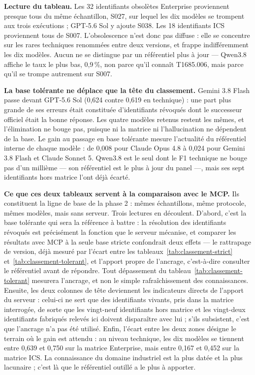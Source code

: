 \textbf{Lecture du tableau.} Les 32 identifiants obsolètes Enterprise proviennent presque tous du même échantillon, S027, sur lequel les dix modèles se trompent aux trois exécutions ; GPT-5.6 Sol y ajoute S038. Les 18 identifiants ICS proviennent tous de S007. L'obsolescence n'est donc pas diffuse : elle se concentre sur les rares techniques renommées entre deux versions, et frappe indifféremment les dix modèles. Aucun ne se distingue par un référentiel plus à jour --- Qwen3.8 affiche le taux le plus bas, 0,9\,\%, non parce qu'il connaît T1685.006, mais parce qu'il se trompe autrement sur S007.

\textbf{La base tolérante ne déplace que la tête du classement.} Gemini 3.8 Flash passe devant GPT-5.6 Sol (0,624 contre 0,619 en technique) : une part plus grande de ses erreurs était constituée d'identifiants révoqués dont le successeur officiel était la bonne réponse. Les quatre modèles retenus restent les mêmes, et l'élimination ne bouge pas, puisque ni la matrice ni l'hallucination ne dépendent de la base. Le gain au passage en base tolérante mesure l'actualité du référentiel interne de chaque modèle : de 0,008 pour Claude Opus 4.8 à 0,024 pour Gemini 3.8 Flash et Claude Sonnet 5. Qwen3.8 est le seul dont le F1 technique ne bouge pas d'un millième --- son référentiel est le plus à jour du panel ---, mais ses sept identifiants hors matrice l'ont déjà écarté.

\textbf{Ce que ces deux tableaux servent à la comparaison avec le MCP.} Ils constituent la ligne de base de la phase 2 : mêmes échantillons, même protocole, mêmes modèles, mais sans serveur. Trois lectures en découlent. D'abord, c'est la base tolérante qui sera la référence à battre : la résolution des identifiants révoqués est précisément la fonction que le serveur mécanise, et comparer les résultats avec MCP à la seule base stricte confondrait deux effets --- le rattrapage de version, déjà mesuré par l'écart entre les tableaux~\ref{tab:classement-strict} et~\ref{tab:classement-tolerant}, et l'apport propre de l'ancrage, c'est-à-dire consulter le référentiel avant de répondre. Tout dépassement du tableau~\ref{tab:classement-tolerant} mesurera l'ancrage, et non le simple rafraîchissement des connaissances. Ensuite, les deux colonnes de tête deviennent les indicateurs directs de l'apport du serveur : celui-ci ne sert que des identifiants vivants, pris dans la matrice interrogée, de sorte que les vingt-neuf identifiants hors matrice et les vingt-deux identifiants fabriqués relevés ici doivent disparaître avec lui ; s'ils subsistent, c'est que l'ancrage n'a pas été utilisé. Enfin, l'écart entre les deux zones désigne le terrain où le gain est attendu : au niveau technique, les dix modèles se tiennent entre 0,639 et 0,750 sur la matrice Enterprise, mais entre 0,167 et 0,452 sur la matrice ICS. La connaissance du domaine industriel est la plus datée et la plus lacunaire ; c'est là que le référentiel outillé a le plus à apporter.

